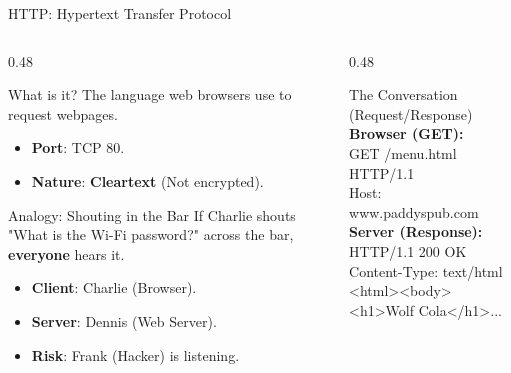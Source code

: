 \documentclass[aspectratio=169]{beamer}  %
\begin{document}
\begin{frame}{HTTP: Hypertext Transfer Protocol}
    \begin{columns}[T]
        \begin{column}{0.48\textwidth}
            \begin{block}{What is it?}
                \small
                The language web browsers use to request webpages.
                \begin{itemize}
                    \item \textbf{Port}: TCP 80.
                    \item \textbf{Nature}: \textbf{Cleartext} (Not encrypted).
                \end{itemize}
            \end{block}
            \begin{exampleblock}{Analogy: Shouting in the Bar}
                \small
                If Charlie shouts "What is the Wi-Fi password?" across the bar, \textbf{everyone} hears it.
                \begin{itemize}
                    \item \textbf{Client}: Charlie (Browser).
                    \item \textbf{Server}: Dennis (Web Server).
                    \item \textbf{Risk}: Frank (Hacker) is listening.
                \end{itemize}
            \end{exampleblock}
        \end{column}
        \begin{column}{0.48\textwidth}
            \begin{block}{The Conversation (Request/Response)}
                \ttfamily\scriptsize
                \textbf{Browser (GET):}\\
                GET /menu.html HTTP/1.1\\
                Host: www.paddyspub.com\\
                \textbf{Server (Response):}\\
                HTTP/1.1 200 OK\\
                Content-Type: text/html\\
                <html><body><h1>Wolf Cola</h1>...
            \end{block}

\end{column}
\end{columns}
\end{frame}
\end{document}
